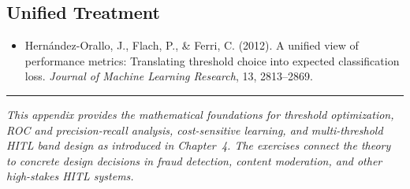 \subsection*{Unified Treatment}
\begin{itemize}
    \item Hernández-Orallo, J., Flach, P., \& Ferri, C. (2012). A unified view of performance metrics: Translating threshold choice into expected classification loss. \textit{Journal of Machine Learning Research}, 13, 2813--2869.
\end{itemize}

\bigskip
\begin{center}
\rule{0.5\textwidth}{0.4pt}
\end{center}
\bigskip

\noindent\textit{This appendix provides the mathematical foundations for threshold optimization, ROC and precision-recall analysis, cost-sensitive learning, and multi-threshold HITL band design as introduced in Chapter~4. The exercises connect the theory to concrete design decisions in fraud detection, content moderation, and other high-stakes HITL systems.}
\apxnumoff
